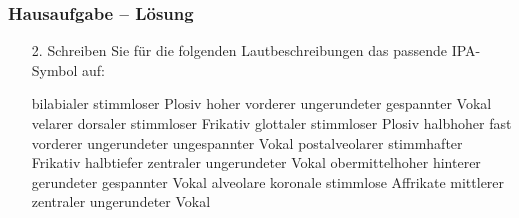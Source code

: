 \begin{frame}
\frametitle{Hausaufgabe -- Lösung}

\begin{itemize}
	\item[2.] {Schreiben Sie für die folgenden Lautbeschreibungen das passende IPA-Symbol auf:}
	
	\begin{exe}
		\settowidth{} 
		\begin{xlist}
			\ex bilabialer stimmloser Plosiv
			\ex hoher vorderer ungerundeter gespannter Vokal
			\ex velarer dorsaler stimmloser Frikativ
			\ex glottaler stimmloser Plosiv
			\ex halbhoher fast vorderer ungerundeter ungespannter Vokal
			\ex postalveolarer stimmhafter Frikativ
			\ex halbtiefer zentraler ungerundeter Vokal
			\ex obermittelhoher hinterer gerundeter gespannter Vokal
			\ex alveolare koronale stimmlose Affrikate
			\ex mittlerer zentraler ungerundeter Vokal
		\end{xlist}
	\end{exe}
	
\end{itemize}

\end{frame}


